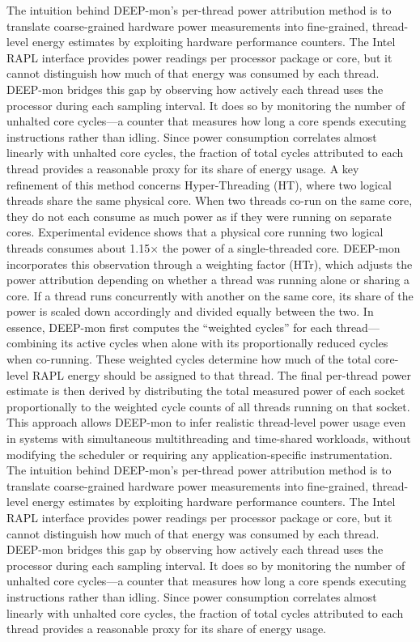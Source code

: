 The intuition behind DEEP-mon’s per-thread power attribution method is to translate coarse-grained hardware power measurements into fine-grained, thread-level energy estimates by exploiting hardware performance counters. The Intel RAPL interface provides power readings per processor package or core, but it cannot distinguish how much of that energy was consumed by each thread. DEEP-mon bridges this gap by observing how actively each thread uses the processor during each sampling interval. It does so by monitoring the number of unhalted core cycles—a counter that measures how long a core spends executing instructions rather than idling. Since power consumption correlates almost linearly with unhalted core cycles, the fraction of total cycles attributed to each thread provides a reasonable proxy for its share of energy usage.
A key refinement of this method concerns Hyper-Threading (HT), where two logical threads share the same physical core. When two threads co-run on the same core, they do not each consume as much power as if they were running on separate cores. Experimental evidence shows that a physical core running two logical threads consumes about 1.15× the power of a single-threaded core. DEEP-mon incorporates this observation through a weighting factor (HTr), which adjusts the power attribution depending on whether a thread was running alone or sharing a core. If a thread runs concurrently with another on the same core, its share of the power is scaled down accordingly and divided equally between the two.
In essence, DEEP-mon first computes the “weighted cycles” for each thread—combining its active cycles when alone with its proportionally reduced cycles when co-running. These weighted cycles determine how much of the total core-level RAPL energy should be assigned to that thread. The final per-thread power estimate is then derived by distributing the total measured power of each socket proportionally to the weighted cycle counts of all threads running on that socket. This approach allows DEEP-mon to infer realistic thread-level power usage even in systems with simultaneous multithreading and time-shared workloads, without modifying the scheduler or requiring any application-specific instrumentation.
The intuition behind DEEP-mon’s per-thread power attribution method is to translate coarse-grained hardware power measurements into fine-grained, thread-level energy estimates by exploiting hardware performance counters. The Intel RAPL interface provides power readings per processor package or core, but it cannot distinguish how much of that energy was consumed by each thread. DEEP-mon bridges this gap by observing how actively each thread uses the processor during each sampling interval. It does so by monitoring the number of unhalted core cycles—a counter that measures how long a core spends executing instructions rather than idling. Since power consumption correlates almost linearly with unhalted core cycles, the fraction of total cycles attributed to each thread provides a reasonable proxy for its share of energy usage.
